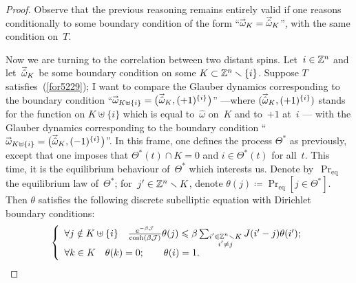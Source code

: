 \begin{proof}
Observe that the previous reasoning remains entirely valid if one reasons conditionally
to some boundary condition of the form ``$\vec\omega_K = \vechat{\omega}_K$'',
with the same condition on~$T$.

Now we are turning to the correlation between two distant spins.
Let~$i\in\mathbb{Z}^n$ and let~$\vechat{\omega}_K$ be some boundary condition on
some $K \subset \mathbb{Z}^n\smallsetminus\{i\}$.
Suppose $T$ satisfies~(\ref{for5229});
I want to compare the Glauber dynamics corresponding to the boundary condition
``$\vec\omega_{K\uplus\{i\}} = \big(\vechat{\omega}_K, (+1)^{\{i\}}\big)$''%
—where $(\vechat{\omega}_K, (+1)^{\{i\}})$ stands for the function on
$K\uplus\{i\}$ which is equal to~$\hat\omega$ on~$K$ and to~$+1$ at~$i$ —%
with the Glauber dynamics corresponding to the boundary condition
``$\vec\omega_{K\uplus\{i\}} = \big(\vechat{\omega}_K, (-1)^{\{i\}}\big)$''.
In this frame, one defines the process $\Theta^*$ as previously,
except that one imposes that $\Theta^*(t) \cap K = 0$ and $i \in \Theta^*(t)$ for all~$t$.
This time, it is the equilibrium behaviour of~$\Theta^*$ which interests us.
Denote by~$\Pr_{\text{eq}}$ the equilibrium law of~$\Theta^*$;
for~$j'\in\mathbb{Z}^n\smallsetminus K$, denote $\theta(j) \coloneqq \Pr_{\text{eq}}[j\in \Theta^*]$.
Then $\theta$ satisfies the following discrete subelliptic equation
with Dirichlet boundary conditions:
%
\[\label{fo7960} \left\{ \begin{array}{ll}
\forall j\notin K\uplus\{i\}
\quad \frac{e^{-\beta\mcal{J}}}{\cosh(\beta\mcal{J})} \theta(j) \leq
\beta \sum_{\substack{i'\in\ZZ^n\setminus K \\ i'\neq j}} J(i'-j) \theta(i') ;\\
\forall k\in K \quad \theta(k) = 0; \qquad \theta(i) = 1.
\end{array} \right. \]


\end{proof}
